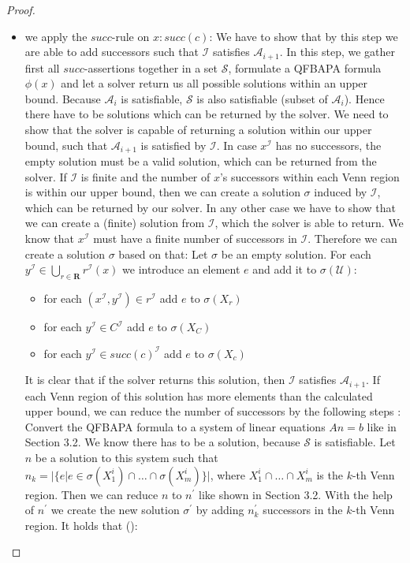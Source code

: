 \documentclass{book}
\theoremstyle{break}
\theoremstyle{definition}
\begin{document}
\begin{proof}
\begin{itemize}
\item we apply the $succ$-rule on $x:succ(c)$: We have to show that by this step we are able to add successors such that $\mathcal{I}$ satisfies $\mathcal{A}_{i+1}$. In this step, we gather first all $succ$-assertions together in a set $\mathcal{S}$, formulate a QFBAPA formula $\phi(x)$ and let a solver return us all possible solutions within an upper bound. Because $\mathcal{A}_i$ is satisfiable, $\mathcal{S}$ is also satisfiable (subset of $\mathcal{A}_i$). Hence there have to be solutions which can be returned by the solver. We need to show that the solver is capable of returning a solution within our upper bound, such that $\mathcal{A}_{i+1}$ is satisfied by $\mathcal{I}$. In case $x^\mathcal{I}$ has no successors, the empty solution must be a valid solution, which can be returned from the solver. If $\mathcal{I}$ is finite and the number of $x$'s successors within each Venn region is within our upper bound, then we can create a solution $\sigma$ induced by $\mathcal{I}$, which can be returned by our solver. In any other case we have to show that we can create a (finite) solution from $\mathcal{I}$, which the solver is able to return. We know that $x^\mathcal{I}$ must have a finite number of successors in $\mathcal{I}$. Therefore we can create a solution $\sigma$ based on that: Let $\sigma$ be an empty solution. For each $y^\mathcal{I}\in \bigcup_{r\in\mathbf{R}}r^\mathcal{I}(x)$ we introduce an element $e$ and add it to $\sigma(\mathcal{U})$:
\begin{itemize}
\item for each $(x^\mathcal{I},y^\mathcal{I})\in r^\mathcal{I}$ add $e$ to $\sigma(X_r)$
\item for each $y^\mathcal{I}\in C^\mathcal{I}$ add $e$ to $\sigma(X_C)$
\item for each $y^\mathcal{I}\in succ(c)^\mathcal{I}$ add $e$ to $\sigma(X_c)$
\end{itemize}
It is clear that if the solver returns this solution, then $\mathcal{I}$ satisfies $\mathcal{A}_{i+1}$. If each Venn region of this solution has more elements than the calculated upper bound, we can reduce the number of successors by the following steps \cite{knapsack}: Convert the QFBAPA formula to a system of linear equations $An=b$ like in Section 3.2. We know there has to be a solution, because $\mathcal{S}$ is satisfiable. Let $n$ be a solution to this system such that $n_k=|\{e|e\in \sigma(X^i_1)\cap\dots\cap\sigma(X^i_m)\}|$, where $X^i_1\cap\dots\cap X^i_m$ is the $k$-th Venn region. Then we can reduce $n$ to $n^\prime$ like shown in Section 3.2. With the help of $n^\prime$ we create the new solution $\sigma^\prime$ by adding $n^\prime_k$ successors in the $k$-th Venn region. It holds that (\dag):

\end{itemize}
\end{proof}
\end{document}
